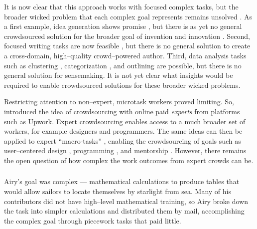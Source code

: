\documentclass[trackingWork]{subfiles}
\begin{document}
It is now clear that this approach works with focused complex tasks, but
the broader wicked problem that each complex goal represents remains unsolved
\cite{rittel1973dilemmas}.
As a first example,
idea generation shows promise
\cite{YuEncouragingOutside,yu2014distributed,Yu2016a},
but there is as yet no general crowdsourced solution for
the broader goal of invention and innovation
\cite{fuge2014analysis}.
Second,
focused writing tasks are now feasible
\cite{Kim2017,bernsteinSoylent,Nebeling:2016:WCW:2858036.2858169,
      writingMicroTasks,agapie2015crowdsourcing}, but
there is no general solution to create
a cross-domain, high--quality crowd--powered author. 
Third,
data analysis tasks such as
clustering \cite{chilton2013cascade},
categorization \cite{andre2014crowd}, and
outlining \cite{luther2015crowdlines}
are possible, but there is no general solution for sensemaking.
It is not yet clear what insights would be required
to enable crowdsourced solutions for these broader wicked problems.

Restricting attention to non--expert, microtask workers proved limiting.
So, \citeauthor{foundry} introduced the idea of crowdsourcing with
online paid \textit{experts} from platforms such as Upwork.
Expert crowdsourcing enables access to a much broader set of workers,
for example designers and programmers.
The same ideas can then be applied to expert ``macro-tasks''
\cite{cheng2015break,haas2015argonaut}, enabling the crowdsourcing of goals such as user--centered design \cite{foundry},
programming \cite{latoza2014microtask,Fast2016,Chen2016}, and
mentorship \cite{suzukiAtelier}.
However, there remains the open question of
how complex the work outcomes from expert crowds can be.


\subsubsection{\pieceworkpers}

\begin{comment}
- Farm workers-->textile
- Limit: human management and oversight
- Evaluation
- Skilled work harder
- Only some organizations can use it
- Management practices
\end{comment}

Airy's goal was complex
--- mathematical calculations to produce tables that would
allow sailors to locate themselves by starlight from sea.
Many of his contributors did not have high--level mathematical training,
so Airy broke down the task into simpler calculations and
distributed them by mail,
accomplishing the complex goal through piecework tasks that paid little.
\end{document}
